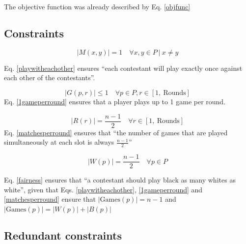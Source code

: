 \documentclass[a4paper, 10pt]{article}
\begin{document}
The objective function was already described by Eq. \ref{objfunc}

\subsection{Constraints}

\begin{equation}
    \label{playwitheachother}
    |M(x,y)| = 1 \quad \forall x,y \in P \ | \  x \neq y
\end{equation}

Eq. \ref{playwitheachother} ensures ``each contestant will play exactly once against each other of the contestants''.


\begin{equation}
    \label{1gameperround}
    |G(p,r)| \leq 1 \quad \forall p \in P, r \in [1, \ \text{Rounds}] 
\end{equation}
Eq. \ref{1gameperround} ensures that a player plays up to 1 game per round.

\begin{equation}
    \label{matchesperround}
    |R(r)| = \frac{n-1}{2}  \quad \forall r \in [1,\ \text{Rounds}] 
\end{equation}
Eq. \ref{matchesperround} ensures that ``the number of games that are played simultaneously at each slot is always $\frac{n-1}{2}$''

\begin{equation}
    \label{fairness}
    |W(p)| = \frac{n-1}{2} \quad \forall p \in P
\end{equation}

Eq. \ref{fairness} ensures that ``a contestant should play black as many whites as white'', 
given that Eqs. \ref{playwitheachother}, \ref{1gameperround} and \ref{matchesperround} ensure that $|\text{Games}(p)| = n - 1$ and $|\text{Games}(p)| = |W(p)| + |B(p)|$  

\subsection{Redundant constraints}
\label{subsec:redundant}
\end{document}
